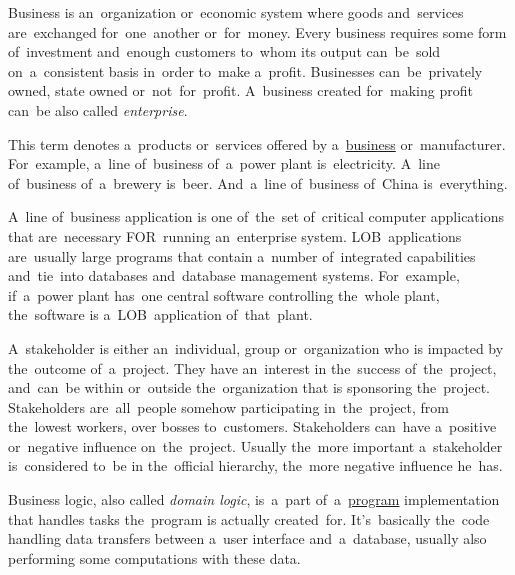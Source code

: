 \label{business}
Business is an~organization or~economic system where goods and~services are~exchanged for~one~another or~for~money. Every business requires some form of~investment and~enough customers to~whom its output can~be~sold on~a~consistent basis in~order to~make a~profit. Businesses can~be~privately owned, state owned or~not~for~profit. A~business created for~making profit can~be also called \textit{enterprise}.

This term denotes a~products or~services offered by a~\hyperref[business]{business} or~manufacturer. For~example, a~line of~business of~a~power plant is~electricity. A~line of~business of~a~brewery is~beer. And~a~line of~business of~China is~everything.

A~line of~business application is one of~the~set of~critical computer applications that are~necessary FOR~running an~enterprise system. LOB~applications are~usually large programs that contain a~number of~integrated capabilities and~tie~into databases and~database management systems. For~example, if~a~power plant has~one central software controlling the~whole plant, the~software is a~LOB~application of~that~plant.

A~stakeholder is either an~individual, group or~organization who is impacted by the~outcome of~a~project. They have an~interest in the~success of~the~project, and~can~be within or~outside the~organization that is sponsoring the~project. Stakeholders are~all~people somehow participating in~the~project, from the~lowest workers, over bosses to~customers. Stakeholders can~have a~positive or~negative influence on~the~project. Usually the~more important a~stakeholder is~considered to~be in the~official hierarchy, the~more negative influence he~has.

\label{businesslogic}
Business logic, also called \textit{domain logic}, is~a~part of~a~\hyperref[applicationprocessprogramservicethread]{program} implementation that handles tasks the~program is actually created~for. It's~basically the~code handling data transfers between a~user interface and~a~database, usually also performing some computations with these data.

